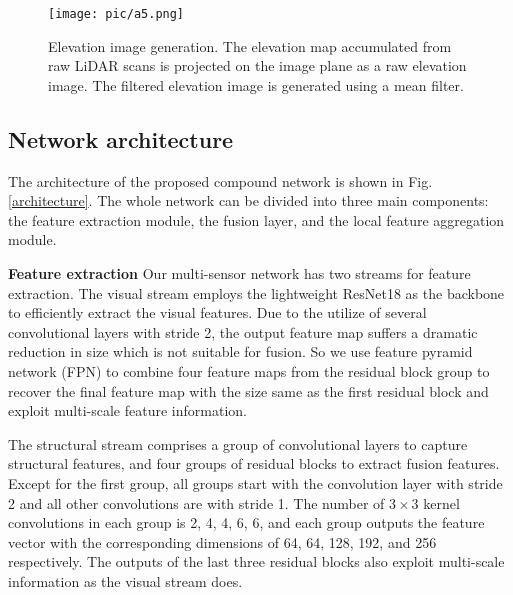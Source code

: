 \documentclass[letterpaper, 10 pt, conference]{ieeeconf}  \usepackage{tabularx}
\begin{document}
\begin{figure}[tp]
	\centering
	\texttt{[image: pic/a5.png]}

	\caption{Elevation image generation. The elevation map accumulated from raw LiDAR scans is projected on the image plane as a raw elevation image. The filtered elevation image is generated using a mean filter.}
	\label{ele_generation}
	\vspace{-10pt}
\end{figure}

\subsection{Network architecture}

The architecture of the proposed compound network is shown in Fig. \ref{architecture}. The whole network can be divided into three main components: the feature extraction module, the fusion layer, and the local feature aggregation module.

\textbf{Feature extraction} Our multi-sensor network has two streams for feature extraction. The visual stream employs the lightweight ResNet18 \cite{he2016deep} as the backbone to efficiently extract the visual features. Due to the utilize of several convolutional layers with stride 2, the output feature map suffers a dramatic reduction in size which is not suitable for fusion. So we use feature pyramid network (FPN) to combine four feature maps from the residual block group to recover the final feature map with the size same as the first residual block and exploit multi-scale feature information. 

The structural stream comprises a group of convolutional layers to capture structural features, and four groups of residual blocks to extract fusion features. Except for the first group, all groups start with the convolution layer with stride 2 and all other convolutions are with stride 1. The number of $3\times3$ kernel convolutions in each group is 2, 4, 4, 6, 6, and each group outputs the feature vector with the corresponding dimensions of 64, 64, 128, 192, and 256 respectively. The outputs of the last three residual blocks also exploit multi-scale information as the visual stream does.
\end{document}
